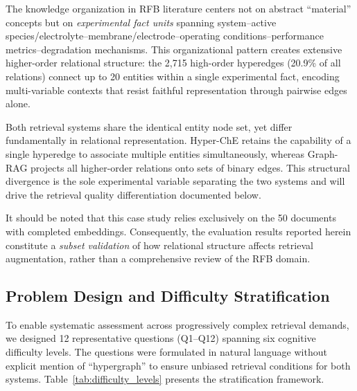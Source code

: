 The knowledge organization in RFB literature centers not on abstract ``material'' concepts but on \emph{experimental fact units} spanning system--active species/electrolyte--membrane/electrode--operating conditions--performance metrics--degradation mechanisms. This organizational pattern creates extensive higher-order relational structure: the 2,715 high-order hyperedges (20.9\% of all relations) connect up to 20 entities within a single experimental fact, encoding multi-variable contexts that resist faithful representation through pairwise edges alone.

Both retrieval systems share the identical entity node set, yet differ fundamentally in relational representation. Hyper-ChE retains the capability of a single hyperedge to associate multiple entities simultaneously, whereas Graph-RAG projects all higher-order relations onto sets of binary edges. This structural divergence is the sole experimental variable separating the two systems and will drive the retrieval quality differentiation documented below.

It should be noted that this case study relies exclusively on the 50 documents with completed embeddings. Consequently, the evaluation results reported herein constitute a \emph{subset validation} of how relational structure affects retrieval augmentation, rather than a comprehensive review of the RFB domain.

\subsection{Problem Design and Difficulty Stratification}
\label{subsec:flow_battery_problems}

To enable systematic assessment across progressively complex retrieval demands, we designed 12 representative questions (Q1--Q12) spanning six cognitive difficulty levels. The questions were formulated in natural language without explicit mention of ``hypergraph'' to ensure unbiased retrieval conditions for both systems. Table~\ref{tab:difficulty_levels} presents the stratification framework.

